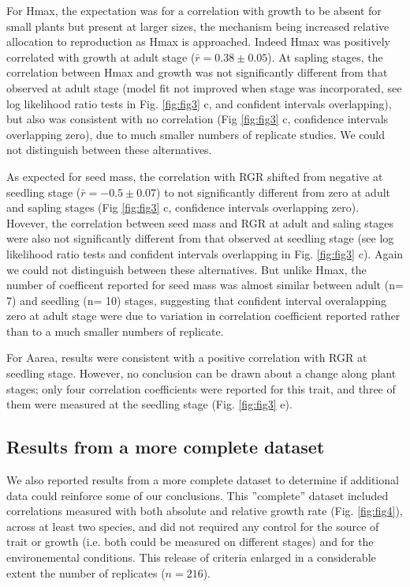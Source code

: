 \documentclass[a4paper,11pt]{article}
\begin{document}
For Hmax, the expectation was for a correlation with growth to be absent for small plants but present at larger sizes, the mechanism being increased relative allocation to reproduction as Hmax is approached. Indeed Hmax was positively correlated with growth at adult stage ($\bar{r}= 0.38 \pm 0.05$). At sapling stages, the correlation between Hmax and growth was not significantly different from that observed at adult stage (model fit not improved when stage was incorporated, see log likelihood ratio tests in Fig. \ref{fig:fig3} c, and confident intervals overlapping), but also was consistent with no correlation (Fig \ref{fig:fig3} c, confidence intervals overlapping zero), due to much smaller numbers of replicate studies. We could not distinguish between these alternatives. 

As expected for seed mass, the correlation with RGR shifted from negative at seedling stage ($\bar{r}= -0.5 \pm 0.07$) to not significantly different from zero at adult and sapling stages (Fig \ref{fig:fig3} c, confidence intervals overlapping zero). Hovever, the correlation between seed mass and RGR at adult and saling stages were also not significantly different from that observed at seedling stage (see log likelihood ratio tests and confident intervals overlapping in Fig. \ref{fig:fig3} c). Again we could not distinguish between these alternatives. But unlike Hmax, the number of coefficent reported for seed mass was almost similar between adult (n= 7) and seedling (n= 10) stages, suggesting that confident interval overalapping zero at adult stage were due to variation in correlation coefficient reported rather than to a much smaller numbers of replicate.

For Aarea, results were consistent with a positive correlation with RGR at seedling stage. However, no conclusion can be drawn about a change along plant stages; only four correlation coefficients were reported for this trait, and three of them were measured at the seedling stage (Fig. \ref{fig:fig3} e). 

\subsection*{Results from a more complete dataset}

We also reported results from a more complete dataset to determine if additional data could reinforce some of our conclusions. This ''complete'' dataset included correlations measured with both absolute and relative growth rate (Fig. \ref{fig:fig4}), across at least two species, and did not required any control for the source of trait or growth (i.e. both could be measured on different stages) and for the environemental conditions. This release of criteria enlarged in a considerable extent the number of replicates ($n = 216$). 
\end{document}
